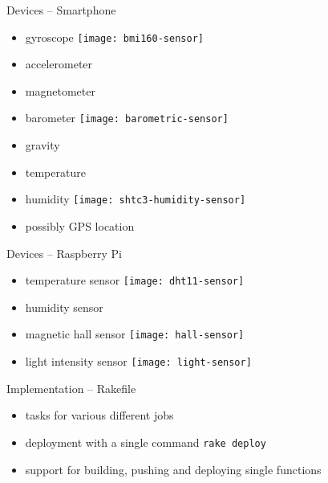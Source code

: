 \documentclass[aspectratio=169]{beamer}
\begin{document}
  
  

  \begin{frame}{Devices -- Smartphone}
    \begin{itemize}
      \item gyroscope
            \hspace*{2em}
            \texttt{[image: bmi160-sensor]}
      \item accelerometer
      \item magnetometer
      \item barometer
            \hspace*{2em}
            \texttt{[image: barometric-sensor]}
      \item gravity
      \item temperature
      \item humidity
            \hspace*{2em}
            \texttt{[image: shtc3-humidity-sensor]}
      \item possibly GPS location
    \end{itemize}
  \end{frame}

  \begin{frame}{Devices -- Raspberry Pi}
    \begin{itemize}
      \item temperature sensor
            \hspace*{2em}
            \texttt{[image: dht11-sensor]}
      \item humidity sensor
      \item magnetic hall sensor
            \hspace*{2em}
            \texttt{[image: hall-sensor]}
      \item light intensity sensor
            \hspace*{2em}
            \texttt{[image: light-sensor]}
    \end{itemize}
  \end{frame}

  \begin{frame}{Implementation -- Rakefile}
    \begin{itemize}
      \item tasks for various different jobs
      \item deployment with a single command \lstinline{rake deploy}
      \item support for building, pushing and deploying single functions
    \end{itemize}
  \end{frame}
\end{document}
